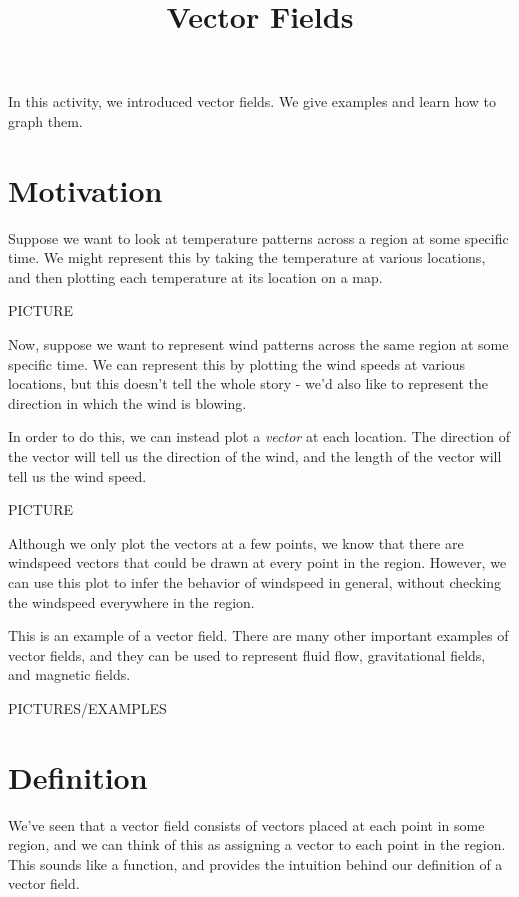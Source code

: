 \documentclass{ximera}
\title{Vector Fields}
\begin{document}
\begin{abstract}
\end{abstract}
\maketitle

In this activity, we introduced vector fields. We give examples and learn how to graph them.

\section*{Motivation}

Suppose we want to look at temperature patterns across a region at some specific time. We might represent this by taking the temperature at various locations, and then plotting each temperature at its location on a map.

PICTURE

Now, suppose we want to represent wind patterns across the same region at some specific time. We can represent this by plotting the wind speeds at various locations, but this doesn't tell the whole story - we'd also like to represent the direction in which the wind is blowing.

In order to do this, we can instead plot a \emph{vector} at each location. The direction of the vector will tell us the direction of the wind, and the length of the vector will tell us the wind speed.

PICTURE

Although we only plot the vectors at a few points, we know that there are windspeed vectors that could be drawn at every point in the region. However, we can use this plot to infer the behavior of windspeed in general, without checking the windspeed everywhere in the region.

This is an example of a vector field. There are many other important examples of vector fields, and they can be used to represent fluid flow, gravitational fields, and magnetic fields. 

PICTURES/EXAMPLES

\section*{Definition}

We've seen that a vector field consists of vectors placed at each point in some region, and we can think of this as assigning a vector to each point in the region. This sounds like a function, and provides the intuition behind our definition of a vector field.
\end{document}
